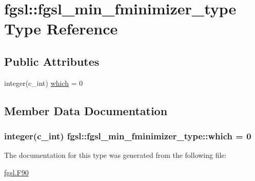 \hypertarget{structfgsl_1_1fgsl__min__fminimizer__type}{\section{fgsl\-:\-:fgsl\-\_\-min\-\_\-fminimizer\-\_\-type Type Reference}
\label{structfgsl_1_1fgsl__min__fminimizer__type}
}
\subsection*{Public Attributes}
\begin{DoxyCompactItemize}
\item 
integer(c\-\_\-int) \hyperlink{structfgsl_1_1fgsl__min__fminimizer__type_a0f03f3712470d4423576f60468717637}{which} = 0
\end{DoxyCompactItemize}


\subsection{Member Data Documentation}
\hypertarget{structfgsl_1_1fgsl__min__fminimizer__type_a0f03f3712470d4423576f60468717637}{
\subsubsection[{which}]{\setlength{\rightskip}{0pt plus 5cm}integer(c\-\_\-int) fgsl\-::fgsl\-\_\-min\-\_\-fminimizer\-\_\-type\-::which = 0}}\label{structfgsl_1_1fgsl__min__fminimizer__type_a0f03f3712470d4423576f60468717637}


The documentation for this type was generated from the following file\-:\begin{DoxyCompactItemize}
\item 
\hyperlink{fgsl_8F90}{fgsl.\-F90}\end{DoxyCompactItemize}
